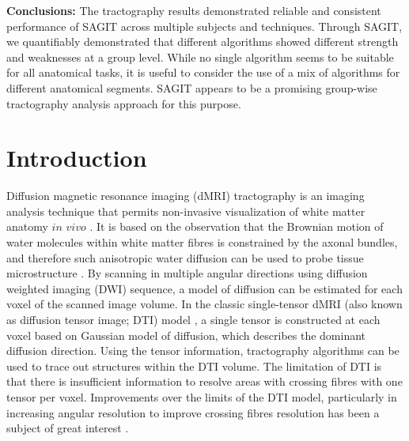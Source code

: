 \textbf{Conclusions:} The tractography results demonstrated reliable and consistent performance of SAGIT across multiple subjects and techniques. Through SAGIT, we quantifiably demonstrated that different algorithms showed different strength and weaknesses at a group level. While no single algorithm seems to be suitable for all anatomical tasks, it is useful to consider the use of a mix of algorithms for different anatomical segments. SAGIT appears to be a promising group-wise tractography analysis approach for this purpose.

\section{Introduction}

Diffusion magnetic resonance imaging (dMRI) tractography is an imaging analysis technique that permits non-invasive visualization of white matter anatomy $in$ $vivo$ \cite{Basser2000}.  It is based on the observation that the Brownian motion of water molecules within white matter fibres is constrained by the axonal bundles, and therefore such anisotropic water diffusion can be used to probe tissue microstructure \cite{Bihan2001a}. By scanning in multiple angular directions using diffusion weighted imaging (DWI) sequence, a model of diffusion can be estimated for each voxel of the scanned image volume. 
In the classic single-tensor dMRI (also known as diffusion tensor image; DTI) model \cite{Basser2002}, a single tensor is constructed at each voxel based on Gaussian model of diffusion, which describes the dominant diffusion direction. Using the tensor information, tractography algorithms \cite{Mori2002b} can be used to trace out structures within the DTI volume. The limitation of DTI is that there is insufficient information to resolve areas with crossing fibres with one tensor per voxel. Improvements over the limits of the DTI model, particularly in increasing angular resolution to improve crossing fibres resolution has been a subject of great interest \cite{Fritzsche2010d,Jeurissen2012d,Tuch2002f}.

